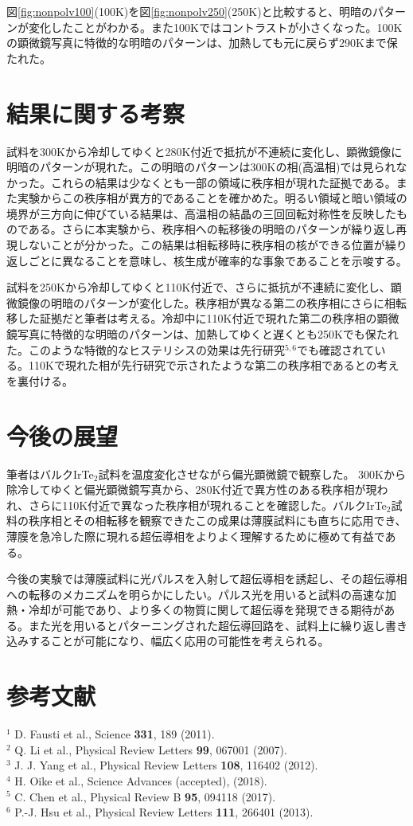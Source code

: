 \documentclass[11pt,a4paper]{jsarticle}
\begin{document}
図\ref{fig:nonpolv100}(100K)を図\ref{fig:nonpolv250}(250K)と比較すると、明暗のパターンが変化したことがわかる。また100Kではコントラストが小さくなった。100Kの顕微鏡写真に特徴的な明暗のパターンは、加熱しても元に戻らず290Kまで保たれた。
 

\section{結果に関する考察}
試料を300Kから冷却してゆくと280K付近で抵抗が不連続に変化し、顕微鏡像に明暗のパターンが現れた。この明暗のパターンは300Kの相(高温相)では見られなかった。これらの結果は少なくとも一部の領域に秩序相が現れた証拠である。また実験からこの秩序相が異方的であることを確かめた。明るい領域と暗い領域の境界が三方向に伸びている結果は、高温相の結晶の三回回転対称性を反映したものである。さらに本実験から、秩序相への転移後の明暗のパターンが繰り返し再現しないことが分かった。この結果は相転移時に秩序相の核ができる位置が繰り返しごとに異なることを意味し、核生成が確率的な事象であることを示唆する。

試料を250Kから冷却してゆくと110K付近で、さらに抵抗が不連続に変化し、顕微鏡像の明暗のパターンが変化した。秩序相が異なる第二の秩序相にさらに相転移した証拠だと筆者は考える。冷却中に110K付近で現れた第二の秩序相の顕微鏡写真に特徴的な明暗のパターンは、加熱してゆくと遅くとも250Kでも保たれた。このような特徴的なヒステリシスの効果は先行研究$^{5,6}$でも確認されている。110Kで現れた相が先行研究で示されたような第二の秩序相であるとの考えを裏付ける。
 
 \section{今後の展望}
筆者はバルクIrTe$_2$試料を温度変化させながら偏光顕微鏡で観察した。
300Kから除冷してゆくと偏光顕微鏡写真から、280K付近で異方性のある秩序相が現われ、さらに110K付近で異なった秩序相が現れることを確認した。バルクIrTe$_2$試料の秩序相とその相転移を観察できたこの成果は薄膜試料にも直ちに応用でき、薄膜を急冷した際に現れる超伝導相をよりよく理解するために極めて有益である。

今後の実験では薄膜試料に光パルスを入射して超伝導相を誘起し、その超伝導相への転移のメカニズムを明らかにしたい。パルス光を用いると試料の高速な加熱・冷却が可能であり、より多くの物質に関して超伝導を発現できる期待がある。また光を用いるとパターニングされた超伝導回路を、試料上に繰り返し書き込みすることが可能になり、幅広く応用の可能性を考えられる。


\section*{参考文献}
\noindent
$^1$ D. Fausti et al., Science {\bf 331}, 189 (2011).\\
$^2$ Q. Li et al.,  Physical Review Letters {\bf99}, 067001 (2007).\\
$^3$ J. J. Yang et al., Physical Review Letters {\bf 108}, 116402 (2012).\\
$^4$ H. Oike et al., Science Advances (accepted), (2018).\\
$^5$ C. Chen et al., Physical Review B {\bf 95}, 094118 (2017).\\
$^6$ P.-J. Hsu et al., Physical Review Letters {\bf 111}, 266401 (2013).\\
\end{document}
